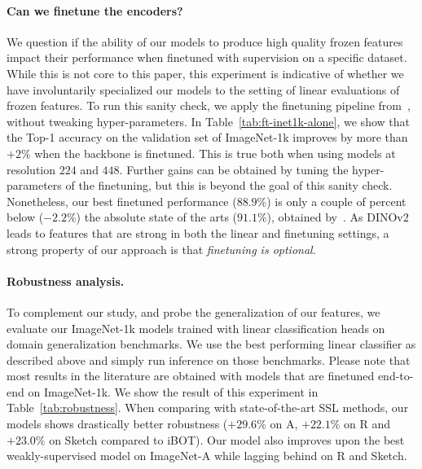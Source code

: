 \paragraph{Can we finetune the encoders?} We question if the ability of our models to produce high quality frozen features impact their performance when finetuned with supervision on a specific dataset. While this is not core to this paper, this experiment is indicative of whether we have involuntarily specialized our models to the setting of linear evaluations of frozen features. To run this sanity check, we apply the finetuning pipeline from~\citet{touvron2022deit}, without tweaking hyper-parameters. In Table~\ref{tab:ft-inet1k-alone}, we show that the Top-1 accuracy on the validation set of ImageNet-1k improves by more than $+2\%$ when the backbone is finetuned. This is true both when using models at resolution $224$ and $448$. Further gains can be obtained by tuning the hyper-parameters of the finetuning, but this is beyond the goal of this sanity check. Nonetheless, our best finetuned performance ($88.9\%$) is only a couple of percent below ($-2.2\%$) the absolute state of the arts ($91.1\%$), obtained by~\citet{chen2023symbolic}.
As DINOv2 leads to features that are strong in both the linear and finetuning settings, a strong property of our approach is that \textit{finetuning is optional}.

\paragraph{Robustness analysis.} To complement our study, and probe the generalization of our features, we evaluate our ImageNet-1k models trained with linear classification heads on domain generalization benchmarks. We use the best performing linear classifier as described above and simply run inference on those benchmarks. Please note that most results in the literature are obtained with models that are finetuned end-to-end on ImageNet-1k. We show the result of this experiment in Table~\ref{tab:robustness}.
When comparing with state-of-the-art SSL methods, our models shows drastically better robustness ($+29.6\%$ on A, $+22.1\%$ on R and $+23.0\%$ on Sketch compared to iBOT). Our model also improves upon the best weakly-supervised model on ImageNet-A while lagging behind on R and Sketch.

